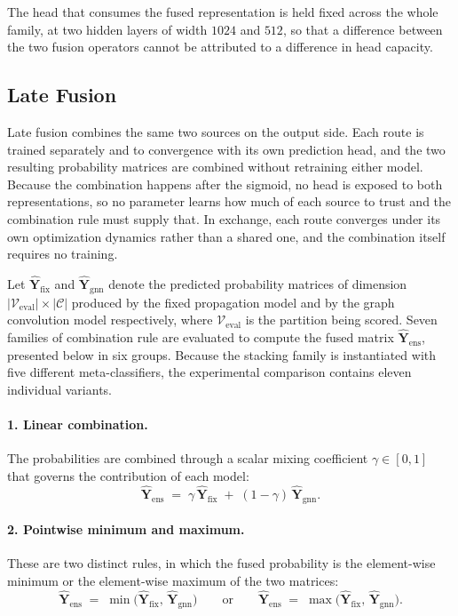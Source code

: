 \documentclass[Ingles]{ic-tese-v3}
\begin{document}
The head that consumes the fused representation is held fixed across the whole family, at two hidden
layers of width $1024$ and $512$, so that a difference between the two fusion operators cannot be
attributed to a difference in head capacity.

\subsection{Late Fusion}
\label{sec:met_late}

Late fusion combines the same two sources on the output side. Each route is trained separately and
to convergence with its own prediction head, and the two resulting probability matrices are combined
without retraining either model. Because the combination happens after the sigmoid, no head is
exposed to both representations, so no parameter learns how much of each source to trust and the
combination rule must supply that. In exchange, each route converges under its own optimization
dynamics rather than a shared one, and the combination itself requires no training.

Let $\hat{\mathbf{Y}}_{\text{fix}}$ and $\hat{\mathbf{Y}}_{\text{gnn}}$ denote the predicted
probability matrices of dimension $|\mathcal{V}_{\text{eval}}| \times |\mathcal{C}|$ produced by the
fixed propagation model and by the graph convolution model respectively, where
$\mathcal{V}_{\text{eval}}$ is the partition being scored. Seven families of combination rule are
evaluated to compute the fused matrix $\hat{\mathbf{Y}}_{\text{ens}}$, presented below in six
groups.
Because the stacking family is instantiated with five different meta-classifiers, the experimental
comparison contains eleven individual variants.

\paragraph{1. Linear combination.} The probabilities are combined through a scalar mixing
coefficient $\gamma \in [0,1]$ that governs the contribution of each model:
\begin{equation}
  \hat{\mathbf{Y}}_{\text{ens}} \;=\; \gamma\, \hat{\mathbf{Y}}_{\text{fix}}
  \;+\; (1 - \gamma)\, \hat{\mathbf{Y}}_{\text{gnn}}.
  \label{eq:met_ens_linear}
\end{equation}

\paragraph{2. Pointwise minimum and maximum.} These are two distinct rules, in which the fused
probability is the element-wise minimum or the element-wise maximum of the two matrices:
\begin{equation}
  \hat{\mathbf{Y}}_{\text{ens}} \;=\; \min\!\bigl(\hat{\mathbf{Y}}_{\text{fix}},\, \hat{\mathbf{Y}}_{\text{gnn}}\bigr)
  \qquad \text{or} \qquad
  \hat{\mathbf{Y}}_{\text{ens}} \;=\; \max\!\bigl(\hat{\mathbf{Y}}_{\text{fix}},\, \hat{\mathbf{Y}}_{\text{gnn}}\bigr).
  \label{eq:met_ens_minmax}
\end{equation}
\end{document}
